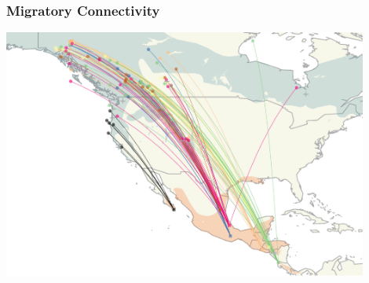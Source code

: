\documentclass[t]{beamer}\usepackage[]{graphicx}\usepackage[]{color}
\begin{document}

%
%
%


\begin{frame}
\frametitle{Migratory Connectivity}

\vspace{-3mm}

\begin{center}
\includegraphics[width=0.9\textwidth]{figs/wintering.png}
\end{center}

\end{frame}

\end{document}
